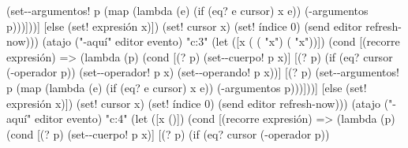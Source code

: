 \documentclass[letterpaper, twoside, openright, 11pt]{book}%
\begin{document}
{{                                  (set--argumentos! p
                                   (map (lambda (e)
                                          (if (eq? e cursor) x e))
                                        (-argumentos p)))]))]
                     [else
                      (set! expresión x)])
               (set! cursor x)
               (set! índice 0)
               (send editor refresh-now)))
      (atajo ("-aquí" editor evento) "c:3"
             (let ([x ( ( "x") ( "x"))])
               (cond [(recorre expresión)
                      => (lambda (p)
                           (cond [(? p)
                                  (set--cuerpo! p x)]
                                 [(? p)
                                  (if (eq? cursor (-operador p))
                                      (set--operador! p x)
                                      (set--operando! p x))]
                                 [(? p)
                                  (set--argumentos! p
                                   (map (lambda (e)
                                          (if (eq? e cursor) x e))
                                        (-argumentos p)))]))]
                     [else
                      (set! expresión x)])
               (set! cursor x)
               (set! índice 0)
               (send editor refresh-now)))
      (atajo ("-aquí" editor evento) "c:4"
             (let ([x ()])
               (cond [(recorre expresión)
                      => (lambda (p)
                           (cond [(? p)
                                  (set--cuerpo! p x)]
                                 [(? p)
                                  (if (eq? cursor (-operador p))
}}
\end{document}

